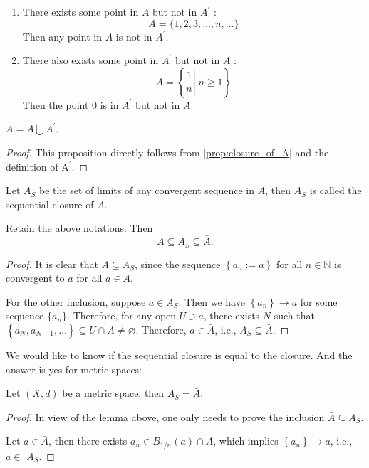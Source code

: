 \begin{example}
\begin{enumerate}
    \item There exists some point in \(A\) but not in \({A}^{\prime}\) :
\[
A = \{ 1,2,3,\ldots,n,\ldots \}
\]
Then any point in \(A\) is not in \({A}^{\prime}\).

\item There also exists some point in \({A}^{\prime}\) but not in \(A\) :
\[
A = \left\{  {\left. \frac{1}{n}\right| \;n \geq  1}\right\}
\]
Then the point 0 is in \({A}^{\prime}\) but not in \(A\).
\end{enumerate} 
\end{example}

\begin{proposition} \(\bar{A} = A\bigcup {A}^{\prime}\).
\end{proposition}

\begin{proof} This proposition directly follows from \autoref{prop:closure_of_A} and the definition of \({\mathrm{A}}^{\prime}\).
\end{proof}

\begin{definition} Let \({A}_{S}\) be the set of limits of any convergent sequence in \(A\), then \({A}_{S}\) is called the sequential closure of \(A\).
\end{definition}

\begin{lemma}Retain the above notations. Then 
\[A \subseteq  {A}_{S} \subseteq  \bar{A}.\]
\end{lemma}
\begin{proof}
It is clear that \(A \subseteq  {A}_{S}\), since the sequence \(\left\{  {{a}_{n} := a}\right\}\) for all $n \in \mathbb{N}$ is convergent to \(a\) for all \(a \in  A\).

For the other inclusion, suppose \(a \in  {A}_{S}\). Then we have \(\left\{  {a}_{n}\right\} \rightarrow  a\) for some sequence $\{a_n\}$. Therefore, for any open \(U \ni  a\), there exists \(N\) such that \(\left\{  {{a}_{N},{a}_{N + 1},\ldots}\right\}   \subseteq  U \cap  A \neq  \varnothing\). Therefore, \(a \in  \bar{A}\), i.e., \({A}_{S} \subseteq  \bar{A}\).
\end{proof}


We would like to know if the sequential closure is equal to the closure. And the answer is yes for metric spaces:
\begin{proposition} Let $(X, d)$ be a metric space, then \({A}_{S} = \bar{A}\).
\end{proposition}
\begin{proof} In view of the lemma above, one only needs to prove the inclusion $\bar{A} \subseteq A_S$. 

Let \(a \in  \bar{A}\), then there exists \({a}_{n} \in  {B}_{1/n}\left(a\right)  \cap  A\), which implies \(\left\{  {a}_{n}\right\}   \rightarrow  a\), i.e., \(a \in\)  \({A}_{S}\).
\end{proof}

